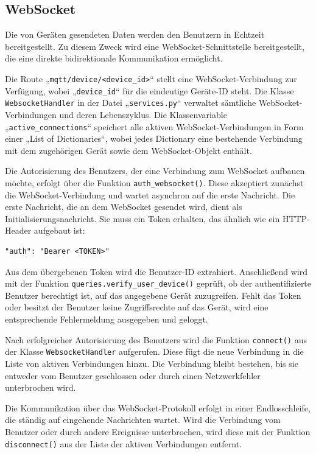 \documentclass[12pt, letterpaper]{article}
\begin{document}
  \subsection{WebSocket}
  \par Die von Geräten gesendeten Daten werden den Benutzern in Echtzeit bereitgestellt. Zu diesem Zweck wird eine WebSocket-Schnittstelle bereitgestellt, die eine direkte bidirektionale Kommunikation ermöglicht.
  \par Die Route „\texttt{mqtt/device/<device\_id>}“ stellt eine WebSocket-Verbindung zur Verfügung, wobei „\texttt{device\_id}“ für die eindeutige Geräte-ID steht. Die Klasse \texttt{WebsocketHandler} in der Datei „\texttt{services.py}“ verwaltet sämtliche WebSocket-Verbindungen und deren Lebenszyklus. Die Klassenvariable „\texttt{active\_connections}“ speichert alle aktiven WebSocket-Verbindungen in Form einer „List of Dictionaries“, wobei jedes Dictionary eine bestehende Verbindung mit dem zugehörigen Gerät sowie dem WebSocket-Objekt enthält.
  \par Die Autorisierung des Benutzers, der eine Verbindung zum WebSocket aufbauen möchte, erfolgt über die Funktion \texttt{auth\_websocket()}. Diese akzeptiert zunächst die WebSocket-Verbindung und wartet asynchron auf die erste Nachricht. Die erste Nachricht, die an dem WebSocket gesendet wird, dient als Initialisierungsnachricht. Sie muss ein Token erhalten, das ähnlich wie ein HTTP-Header aufgebaut ist:
  \begin{Verbatim}[frame=single]
    "auth": "Bearer <TOKEN>"
  \end{Verbatim}
  \par Aus dem übergebenen Token wird die Benutzer-ID extrahiert. Anschließend wird mit der Funktion \texttt{queries.verify\_user\_device()} geprüft, ob der authentifizierte Benutzer berechtigt ist, auf das angegebene Gerät zuzugreifen. Fehlt das Token oder besitzt der Benutzer keine Zugriffsrechte auf das Gerät, wird eine entsprechende Fehlermeldung ausgegeben und geloggt.
  \par Nach erfolgreicher Autorisierung des Benutzers wird die Funktion \texttt{connect()} aus der Klasse \texttt{WebsocketHandler} aufgerufen. Diese fügt die neue Verbindung in die Liste von aktiven Verbindungen hinzu. Die Verbindung bleibt bestehen, bis sie entweder vom Benutzer geschlossen oder durch einen Netzwerkfehler unterbrochen wird.
  \par Die Kommunikation über das WebSocket-Protokoll erfolgt in einer Endlosschleife, die ständig auf eingehende Nachrichten wartet. Wird die Verbindung vom Benutzer oder durch andere Ereignisse unterbrochen, wird diese mit der Funktion \texttt{disconnect()} aus der Liste der aktiven Verbindungen entfernt.
\end{document}
